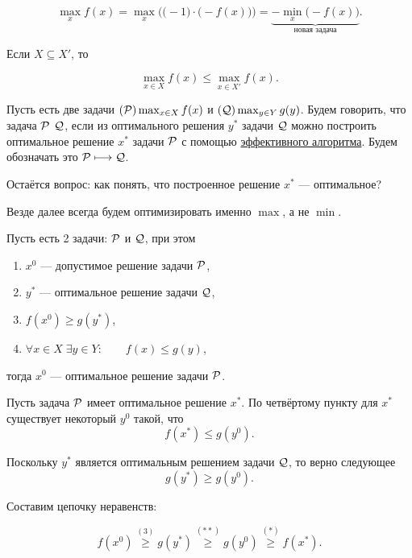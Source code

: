 \fact

\[\max_x f(x) = \max_x \Big(\big(-1\big) \cdot \big(-f(x)\big)\Big) = \underbrace{-\min_x \big(-f(x)\big)}_{\text{новая задача}}.\]


Если $X \subseteq X'$, то

\[\max_{x \in X} f(x) \le \max_{x \in X'} f(x).\]


Пусть есть две задачи $(\P) \max_{x \in X} f(x)$ и $(\Q) \max_{y \in Y} g(y)$. Будем говорить, что задача $\P$  $\Q$, если из оптимального решения $y^*$ задачи $\Q$ можно построить оптимальное решение $x^*$ задачи $\P$ с помощью \underline{эффективного алгоритма}. Будем обозначать это $\P \maps \Q$.

Остаётся вопрос: как понять, что построенное решение $x^*$ --- оптимальное?

\remark

Везде далее всегда будем оптимизировать именно $\max$, а не $\min$.


Пусть есть 2 задачи: $\P$ и $\Q$, при этом
\begin{enumerate}[nosep]
	\item $x^0$ --- допустимое решение задачи $\P$,
	
	\item $y^*$ --- оптимальное решение задачи $\Q$,
	
	\item $f(x^0) \ge g(y^*)$,
	
	\item $\forall x \in X \; \exists y \in Y : \qquad f(x) \le g(y)$,
\end{enumerate}

тогда $x^0$ --- оптимальное решение задачи $\P$.

\prooof

Пусть задача $\P$ имеет оптимальное решение $x^*$. По четвёртому пункту для $x^*$ существует некоторый $y^0$ такой, что 
\[f(x^*) \le g(y^0). \tag{*}\]

Поскольку $y^*$ является оптимальным решением задачи $\Q$, то верно следующее
\[g(y^*) \ge g(y^0). \tag{**}\]

Составим цепочку неравенств:

\[f(x^0) \stackrel{(3)}{\ge} g(y^*) \stackrel{(**)}{\ge} g(y^0) \stackrel{(*)}{\ge} f(x^*).\]

